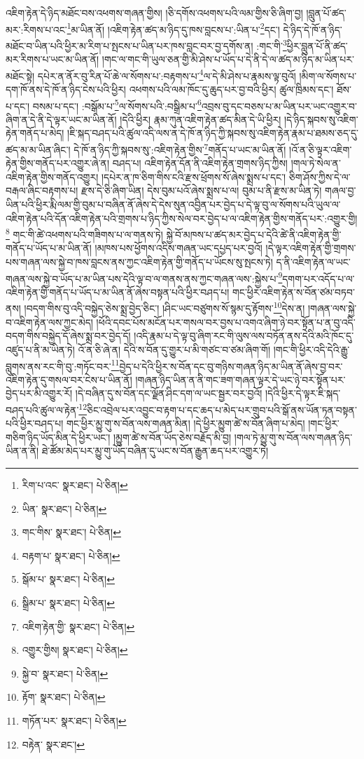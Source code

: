 འཇིག་རྟེན་དེ་ཉིད་མཐོང་བས་འཕགས་གཞན་གྱིས། །ཅི་དགོས་འཕགས་པའི་ལམ་གྱིས་ཅི་ཞིག་བྱ། །བླུན་པོ་ཚད་མར་:རིགས་པ་འང་\footnote{རིག་པ་འང་  སྣར་ཐང་།  པེ་ཅིན། }མ་ཡིན་ནོ། །འཇིག་རྟེན་ཚད་མ་ཉིད་དུ་ཁས་བླངས་པ་:ཡིན་པ་\footnote{ཡིན་  སྣར་ཐང་།  པེ་ཅིན། }དང་། དེ་ཉིད་དེ་ཁོ་ན་ཉིད་མཐོང་བ་ཡིན་པའི་ཕྱིར་མ་རིག་པ་སྤངས་པ་ཡིན་པར་ཁས་བླང་བར་བྱ་དགོས་ན། :གང་གི་\footnote{གང་གིས་  སྣར་ཐང་།  པེ་ཅིན། }ཕྱིར་བླུན་པོ་ནི་ཚད་མར་རིགས་པ་ཡང་མ་ཡིན་ནོ། །གང་ལ་གང་གི་ཡུལ་ཅན་གྱི་མི་ཤེས་པ་ཡོད་པ་དེ་ནི་དེ་ལ་ཚད་མ་ཉིད་མ་ཡིན་པར་མཐོང་སྟེ། དཔེར་ན་ནོར་བུ་རིན་པོ་ཆེ་ལ་སོགས་པ་:བརྟགས་པ་\footnote{བརྟག་པ་  སྣར་ཐང་།  པེ་ཅིན། }ལ་དེ་མི་ཤེས་པ་རྣམས་ལྟ་བུའོ། །མིག་ལ་སོགས་པ་དག་ཁོ་ནས་དེ་ཁོ་ན་ཉིད་ངེས་པའི་ཕྱིར། འཕགས་པའི་ལམ་ཁོང་དུ་ཆུད་པར་བྱ་བའི་ཕྱིར། ཚུལ་ཁྲིམས་དང་། ཐོས་པ་དང་། བསམ་པ་དང་། :བསྒོམ་པ་\footnote{སྒོམ་པ་  སྣར་ཐང་།  པེ་ཅིན། }ལ་སོགས་པའི་:བསྒྲིམ་པ་\footnote{སྒྲིམ་པ་  སྣར་ཐང་།  པེ་ཅིན། }འབྲས་བུ་དང་བཅས་པ་མ་ཡིན་པར་ཡང་འགྱུར་བ་ཞིག་ན་དེ་ནི་དེ་ལྟར་ཡང་མ་ཡིན་ནོ། །དེའི་ཕྱིར། རྣམ་ཀུན་འཇིག་རྟེན་ཚད་མིན་དེ་ཡི་ཕྱིར། །དེ་ཉིད་སྐབས་སུ་འཇིག་རྟེན་གནོད་པ་མེད། །ཇི་སྐད་བཤད་པའི་ཚུལ་འདི་ལས་ན་དེ་ཁོ་ན་ཉིད་ཀྱི་སྐབས་སུ་འཇིག་རྟེན་རྣམ་པ་ཐམས་ཅད་དུ་ཚད་མ་མ་ཡིན་ཞིང་། དེ་ཁོ་ན་ཉིད་ཀྱི་སྐབས་སུ་:འཇིག་རྟེན་གྱིས་\footnote{འཇིག་རྟེན་གྱི་  སྣར་ཐང་།  པེ་ཅིན། }གནོད་པ་ཡང་མ་ཡིན་ནོ། །འོ་ན་ཅི་ལྟར་འཇིག་རྟེན་གྱིས་གནོད་པར་འགྱུར་ཞེ་ན། བཤད་པ། འཇིག་རྟེན་དོན་ནི་འཇིག་རྟེན་གྲགས་ཉིད་ཀྱིས། །གལ་ཏེ་སེལ་ན་འཇིག་རྟེན་གྱིས་གནོད་འགྱུར། །དཔེར་ན་ཁ་ཅིག་གིས་ངའི་རྫས་ཕྲོགས་སོ་ཞེས་སྨྲས་པ་དང་། ཅིག་ཤོས་ཀྱིས་དེ་ལ་བརྒལ་ཞིང་བརྟགས་པ། རྫས་དེ་ཅི་ཞིག་ཡིན། དེས་བུམ་པའོ་ཞེས་སྨྲས་པ་ལ། བུམ་པ་ནི་རྫས་མ་ཡིན་ཏེ། གཞལ་བྱ་ཡིན་པའི་ཕྱིར་རྨི་ལམ་གྱི་བུམ་པ་བཞིན་ནོ་ཞེས་དེ་དེས་སུན་འབྱིན་པར་བྱེད་པ་དེ་ལྟ་བུ་ལ་སོགས་པའི་ཡུལ་ལ་འཇིག་རྟེན་པའི་དོན་འཇིག་རྟེན་པའི་གྲགས་པ་ཉིད་ཀྱིས་སེལ་བར་བྱེད་པ་ལ་འཇིག་རྟེན་གྱིས་གནོད་པར་:འགྱུར་གྱི།\footnote{འགྱུར་གྱིས།  སྣར་ཐང་།  པེ་ཅིན། } གང་གི་ཚེ་འཕགས་པའི་གཟིགས་པ་ལ་གནས་ཏེ། སྐྱེ་བོ་མཁས་པ་ཚད་མར་བྱེད་པ་དེའི་ཚེ་ནི་འཇིག་རྟེན་གྱི་གནོད་པ་ཡོད་པ་མ་ཡིན་ནོ། །མཁས་པས་ཕྱོགས་འདིས་གཞན་ཡང་དཔྱད་པར་བྱའོ། །དེ་ལྟར་འཇིག་རྟེན་གྱི་གྲགས་པས་གཞན་ལས་སྐྱེ་བ་ཁས་བླངས་ནས་ཀྱང་འཇིག་རྟེན་གྱི་གནོད་པ་ཡོངས་སུ་སྤངས་ཏེ། ད་ནི་འཇིག་རྟེན་ལ་ཡང་གཞན་ལས་སྐྱེ་བ་ཡོད་པ་མ་ཡིན་པས་དེའི་ལྟ་བ་ལ་གནས་ནས་ཀྱང་གཞན་ལས་:སྐྱེས་པ་\footnote{སྐྱེ་བ་  སྣར་ཐང་།  པེ་ཅིན། }དགག་པར་འདོད་པ་ལ་འཇིག་རྟེན་གྱི་གནོད་པ་ཡོད་པ་མ་ཡིན་ནོ་ཞེས་བསྟན་པའི་ཕྱིར་བཤད་པ། གང་ཕྱིར་འཇིག་རྟེན་ས་བོན་ཙམ་བཏབ་ནས། །བདག་གིས་བུ་འདི་བསྐྱེད་ཅེས་སྨྲ་བྱེད་ཅིང་། །ཤིང་ཡང་བཙུགས་སོ་སྙམ་དུ་རྟོགས་\footnote{རྟོག་  སྣར་ཐང་།  པེ་ཅིན། }དེས་ན། །གཞན་ལས་སྐྱེ་བ་འཇིག་རྟེན་ལས་ཀྱང་མེད། །ཕོའི་དབང་པོས་མངོན་པར་གསལ་བར་བྱས་པ་འགའ་ཞིག་ཉེ་བར་སྟོན་པ་ན་བུ་འདི་བདག་གིས་བསྐྱེད་དོ་ཞེས་སྨྲ་བར་བྱེད་དོ། །འདི་རྣམ་པ་དེ་ལྟ་བུ་ཞིག་རང་གི་ལུས་ལས་བཏོན་ནས་དེའི་མའི་ཁོང་དུ་འཛུད་པ་ནི་མ་ཡིན་ཏེ། འོ་ན་ཅི་ཞེ་ན། དེའི་ས་བོན་དུ་གྱུར་པ་མི་གཙང་བ་ཙམ་ཞིག་གོ། །གང་གི་ཕྱིར་འདི་དེའི་རྒྱུ་བླུགས་ནས་རང་གི་བུ་:གཏོང་བར་\footnote{གཏོན་པར་  སྣར་ཐང་།  པེ་ཅིན། }བྱེད་པ་དེའི་ཕྱིར་ས་བོན་དང་བུ་གཉིས་གཞན་ཉིད་མ་ཡིན་ནོ་ཞེས་བྱ་བར་འཇིག་རྟེན་དུ་གསལ་བར་ངེས་པ་ཡིན་ནོ། །གཞན་ཉིད་ཡིན་ན་ནི་གང་ཟག་གཞན་ལྟར་དེ་ཡང་ཉེ་བར་སྟོན་པར་བྱེད་པར་མི་འགྱུར་རོ། །དེ་བཞིན་དུ་ས་བོན་དང་ལྗོན་ཤིང་དག་ལ་ཡང་སྦྱར་བར་བྱའོ། །དེའི་ཕྱིར་དེ་ལྟར་ཇི་སྐད་བཤད་པའི་ཚུལ་ལ་རྟེན་\footnote{བརྟེན་  སྣར་ཐང་། }ཅིང་འབྲེལ་པར་འབྱུང་བ་རྟག་པ་དང་ཆད་པ་མེད་པར་གྲུབ་པའི་སྒོ་ནས་ཡོན་ཏན་བསྟན་པའི་ཕྱིར་བཤད་པ། གང་ཕྱིར་མྱུ་གུ་ས་བོན་ལས་གཞན་མིན། །དེ་ཕྱིར་མྱུག་ཚེ་ས་བོན་ཞིག་པ་མེད། །གང་ཕྱིར་གཅིག་ཉིད་ཡོད་མིན་དེ་ཕྱིར་ཡང་། །མྱུག་ཚེ་ས་བོན་ཡོད་ཅེས་བརྗོད་མི་བྱ། །གལ་ཏེ་མྱུ་གུ་ས་བོན་ལས་གཞན་ཉིད་ཡིན་ན་ནི། ཐེ་ཚོམ་མེད་པར་མྱུ་གུ་ཡོད་བཞིན་དུ་ཡང་ས་བོན་རྒྱུན་ཆད་པར་འགྱུར་ཏེ། 